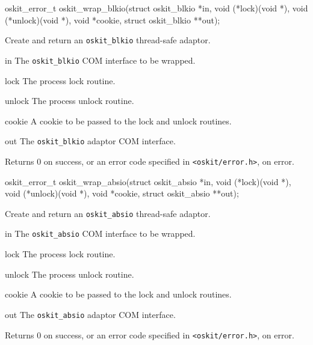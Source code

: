 \begin{apisyn}

	\funcproto oskit_error_t
	oskit_wrap_blkio(struct oskit_blkio *in, 
		void (*lock)(void *), 
		void (*unlock)(void *),
		void *cookie,
		struct oskit_blkio **out);
\end{apisyn}
\begin{apidesc}
	Create and return an {\tt oskit_blkio} thread-safe adaptor.
\end{apidesc}
\begin{apiparm}
	\item[in]
		The {\tt oskit_blkio} COM interface to be wrapped.
	\item[lock]
		The process lock routine.
	\item[unlock]
		The process unlock routine.
	\item[cookie]
		A cookie to be passed to the lock and unlock routines.
	\item[out]
		The {\tt oskit_blkio} adaptor COM interface.
\end{apiparm}
\begin{apiret}
	Returns 0 on success, or an error code specified in
	{\tt <oskit/error.h>}, on error.
\end{apiret}


\begin{apisyn}

	\funcproto oskit_error_t
	oskit_wrap_absio(struct oskit_absio *in, 
		void (*lock)(void *), 
		void (*unlock)(void *),
		void *cookie,
		struct oskit_absio **out);
\end{apisyn}
\begin{apidesc}
	Create and return an {\tt oskit_absio} thread-safe adaptor.
\end{apidesc}
\begin{apiparm}
	\item[in]
		The {\tt oskit_absio} COM interface to be wrapped.
	\item[lock]
		The process lock routine.
	\item[unlock]
		The process unlock routine.
	\item[cookie]
		A cookie to be passed to the lock and unlock routines.
	\item[out]
		The {\tt oskit_absio} adaptor COM interface.
\end{apiparm}
\begin{apiret}
	Returns 0 on success, or an error code specified in
	{\tt <oskit/error.h>}, on error.
\end{apiret}


